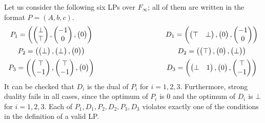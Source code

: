 \documentclass[]{article}
\renewcommand{\.}{\hskip .75pt}
\begin{document}
\noindent %
Let us consider the following six LPs over $F_\infty$;
all of them are written in the format $P=(A,b,c)$.
$$
\begin{array}{c@{\hspace{100pt}}c}
P_1 = \left(
	\begin{pmatrix} \bot \\ \top \end{pmatrix},
	\begin{pmatrix} -1 \\ 0 \end{pmatrix},
	\begin{pmatrix} 0 \end{pmatrix}
\right)
&
D_1 = \left(
	\begin{pmatrix} \top & \bot \end{pmatrix},
	\begin{pmatrix} 0 \end{pmatrix},
	\begin{pmatrix} -1 \\ 0 \end{pmatrix}
\right)
\vspace{5pt} \\
P_2=\left(
	\begin{pmatrix} \bot \end{pmatrix}, 
	\begin{pmatrix} \bot \end{pmatrix}, 
	\begin{pmatrix} 0 \end{pmatrix}
\right)
&
D_2=\left(
	\begin{pmatrix} \top \end{pmatrix},
	\begin{pmatrix} 0 \end{pmatrix},
	\begin{pmatrix} \bot \end{pmatrix}
\right)
\vspace{5pt} \\
P_3=\left(
	\begin{pmatrix} \top \\ -1 \end{pmatrix},
	\begin{pmatrix} \top \\ -1 \end{pmatrix},
	\begin{pmatrix} 0 \end{pmatrix}
\right)
&
D_3=\left(
	\begin{pmatrix} \bot & 1 \end{pmatrix},
	\begin{pmatrix} 0 \end{pmatrix},
	\begin{pmatrix} \top \\ -1 \end{pmatrix}
\right)
\end{array}
$$
It can be checked that $D_i$ is the dual of $P_i$ for $i=1,2,3$.
Furthermore, strong duality fails in all cases, since
the optimum of $P_i$ is $0$ and the optimum of $D_i$ is $\bot$ for $i=1,2,3$.
Each of $P_1,D_1,P_2,D_2,P_3,D_3$ violates exactly one of the conditions
in the definition of a valid LP.
\end{document}
